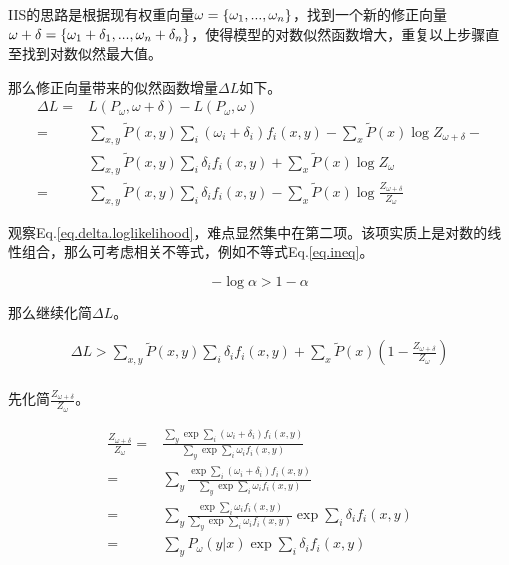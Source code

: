\documentclass{article}
\begin{document}
      IIS的思路是根据现有权重向量$\boldmath{\omega}=\{\omega_{1}, ..., \omega_{n}\}$，找到一个新的修正向量$\boldmath{\omega+\delta}=\{\omega_{1}+\delta_{1}, ..., \omega_{n}+\delta_{n}\}$，使得模型的对数似然函数增大，重复以上步骤直至找到对数似然最大值。
      
%     
	  那么修正向量带来的似然函数增量$\Delta{L}$如下。
	  \begin{equation}
	  	\begin{aligned}
	  		\Delta{L}=&L(P_{\omega},\omega+\delta)-L(P_{\omega}, \omega)\\
	  		=&\sum_{x,y}\tilde{P}(x,y)\sum_{i}(\omega_{i}+\delta_{i})f_{i}(x,y)-\sum_{x}\tilde{P}(x)\log{Z_{\omega+\delta}}-\\
	  		&\sum_{x,y}\tilde{P}(x,y)\sum_{i}\delta_{i}f_{i}(x,y)+\sum_{x}\tilde{P}(x)\log{Z_{\omega}}\\
	  		=&\sum_{x,y}\tilde{P}(x,y)\sum_{i}\delta_{i}f_{i}(x,y)-\sum_{x}\tilde{P}(x)\log{\frac{Z_{\omega+\delta}}{Z_{\omega}}} \label{eq.delta.loglikelihood}
	  	\end{aligned}
	  \end{equation} 
      
      观察Eq.\ref{eq.delta.loglikelihood}，难点显然集中在第二项。该项实质上是对数的线性组合，那么可考虑相关不等式，例如不等式Eq.\ref{eq.ineq}。
      
      \begin{equation}
      	-\log{\alpha}>1-\alpha \label{eq.ineq}
      \end{equation}
  
      那么继续化简$\Delta{L}$。
      
	  \begin{equation}
	  	\begin{aligned}
			\Delta{L}>\sum_{x,y}\tilde{P}(x,y)\sum_{i}\delta_{i}f_{i}(x,y)+\sum_{x}\tilde{P}(x)(1-\frac{Z_{\omega+\delta}}{Z_{\omega}})\\
		\end{aligned}
	  \end{equation} 
  
      先化简$\frac{Z_{\omega+\delta}}{Z_{\omega}}$。
      
      \begin{equation}
      	\begin{aligned}
			\frac{Z_{\omega+\delta}}{Z_{\omega}}=&\frac{\sum_{y}\exp{\sum_{i}(\omega_{i}+\delta_{i})f_{i}(x,y)}}{\sum_{y}\exp{\sum_{i}\omega_{i}f_{i}(x,y)}}\\
			=&\sum_{y}\frac{\exp{\sum_{i}(\omega_{i}+\delta_{i})f_{i}(x,y)}}{\sum_{y}\exp{\sum_{i}\omega_{i}f_{i}(x,y)}}\\
			=&\sum_{y}\frac{\exp{\sum_{i}\omega_{i}f_{i}(x,y)}}{\sum_{y}\exp{\sum_{i}\omega_{i}f_{i}(x,y)}}\exp{\sum_{i}\delta_{i}f_{i}(x,y)}\\
			=&\sum_{y}P_{\omega}(y|x)\exp{\sum_{i}\delta_{i}f_{i}(x,y)}
      	\end{aligned}     	
      \end{equation}
  
\end{document}
